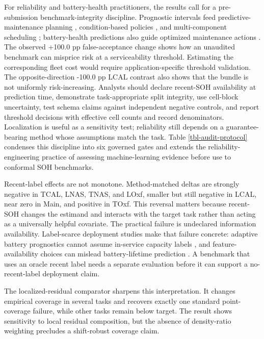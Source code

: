 \documentclass[
  number,
  preprint]{elsarticle}
\begin{document}
For reliability and battery-health practitioners, the results call for a
pre-submission benchmark-integrity discipline. Prognostic intervals feed
predictive-maintenance planning
\citep{mitici2023dynamic, pedersen2022optimizing}, condition-based
policies \citep{zhuang2023prognostic, depater2021predictive}, and
multi-component scheduling
\citep{wang2026dynamic, wang2025multiobjective}; battery-health
predictions also guide optimized maintenance actions
\citep{wang2026multiaction}. The observed +100.0 pp false-acceptance
change shows how an unaudited benchmark can misprice risk at a
serviceability threshold. Estimating the corresponding fleet cost would
require application-specific threshold validation. The
opposite-direction -100.0 pp LCAL contrast also shows that the bundle is
not uniformly risk-increasing. Analysts should declare recent-SOH
availability at prediction time, demonstrate task-appropriate split
integrity, use cell-block uncertainty, test schema claims against
independent negative controls, and report threshold decisions with
effective cell counts and record denominators. Localization is useful as
a sensitivity test; reliability still depends on a guarantee-bearing
method whose assumptions match the task. Table \ref{tbl-audit-protocol}
condenses this discipline into six governed gates and extends the
reliability-engineering practice of assessing machine-learning evidence
before use
\citep{zio2022prognostics, chen2024evaluating, panic2027simple, salinascamus2025comprehensive}
to conformal SOH benchmarks.

Recent-label effects are not monotone. Method-matched deltas are
strongly negative in TCAL, LNAS, TNAS, and LOxf, smaller but still
negative in LCAL, near zero in Main, and positive in TOxf. This reversal
matters because recent-SOH changes the estimand and interacts with the
target task rather than acting as a universally helpful covariate. The
practical failure is undeclared information availability. Label-scarce
deployment studies make that failure concrete: adaptive battery
prognostics cannot assume in-service capacity labels
\citep{zhang2022adaptive, pan2024probabilistic}, and
feature-availability choices can mislead battery-lifetime prediction
\citep{geslin2023selecting}. A benchmark that uses an oracle recent
label needs a separate evaluation before it can support a
no-recent-label deployment claim.

The localized-residual comparator sharpens this interpretation. It
changes empirical coverage in several tasks and recovers exactly one
standard point-coverage failure, while other tasks remain below target.
The result shows sensitivity to local residual composition, but the
absence of density-ratio weighting precludes a shift-robust coverage
claim.
\end{document}
